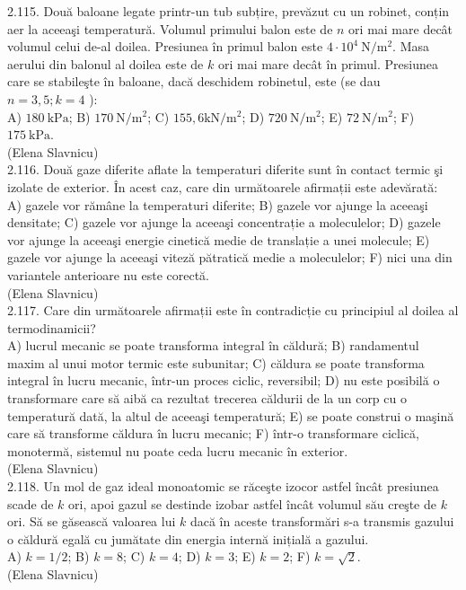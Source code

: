 2.115. Două baloane legate printr-un tub subțire, prevăzut cu un robinet, conțin aer la aceeaşi temperatură. Volumul primului balon este de $n$ ori mai mare decât volumul celui de-al doilea. Presiunea în primul balon este $4 \cdot 10^{4} \mathrm{~N} / \mathrm{m}^{2}$. Masa aerului din balonul al doilea este de $k$ ori mai mare decât în primul. Presiunea care se stabileşte în baloane, dacă deschidem robinetul, este (se dau $n=3,5 ; k=4$ ):\\ A) $180 \mathrm{~kPa}$; B) $170 \mathrm{~N} / \mathrm{m}^{2}$; C) $155,6 \mathrm{kN} / \mathrm{m}^{2}$; D) $720 \mathrm{~N} / \mathrm{m}^{2}$; E) $72 \mathrm{~N} / \mathrm{m}^{2}$; F) $175 \mathrm{~kPa}$.\\ (Elena Slavnicu)\\

2.116. Două gaze diferite aflate la temperaturi diferite sunt în contact termic şi izolate de exterior. În acest caz, care din următoarele afirmații este adevărată:\\ A) gazele vor rămâne la temperaturi diferite; B) gazele vor ajunge la aceeaşi densitate; C) gazele vor ajunge la aceeaşi concentrație a moleculelor; D) gazele vor ajunge la aceeaşi energie cinetică medie de translație a unei molecule; E) gazele vor ajunge la aceeaşi viteză pătratică medie a moleculelor; F) nici una din variantele anterioare nu este corectă.\\ (Elena Slavnicu)\\

2.117. Care din următoarele afirmații este în contradicție cu principiul al doilea al termodinamicii?\\ A) lucrul mecanic se poate transforma integral în căldură; B) randamentul maxim al unui motor termic este subunitar; C) căldura se poate transforma integral în lucru mecanic, într-un proces ciclic, reversibil; D) nu este posibilă o transformare care să aibă ca rezultat trecerea căldurii de la un corp cu o temperatură dată, la altul de aceeaşi temperatură; E) se poate construi o maşină care să transforme căldura în lucru mecanic; F) într-o transformare ciclică, monotermă, sistemul nu poate ceda lucru mecanic în exterior.\\ (Elena Slavnicu)\\

2.118. Un mol de gaz ideal monoatomic se răceşte izocor astfel încât presiunea scade de $k$ ori, apoi gazul se destinde izobar astfel încât volumul său creşte de $k$ ori. Să se găsească valoarea lui $k$ dacă în aceste transformări s-a transmis gazului o căldură egală cu jumătate din energia internă inițială a gazului.\\ A) $k=1 / 2$; B) $k=8$; C) $k=4$; D) $k=3$; E) $k=2$; F) $k=\sqrt{2}$.\\ (Elena Slavnicu)\\

